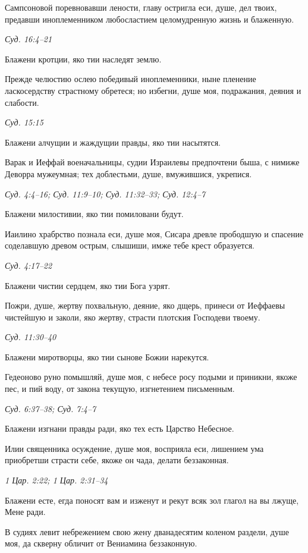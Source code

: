 Сампсоновой поревновавши лености, главу остригла еси, душе, дел твоих, предавши иноплеменником любосластием целомудренную жизнь и блаженную.


\itshape Суд. 16:4–21\normalfont{}


Блажени кротции, яко тии наследят землю.


Прежде челюстию ослею победивый иноплеменники, ныне пленение ласкосердству страстному обретеся; но избегни, душе моя, подражания, деяния и слабости.


\itshape Суд. 15:15\normalfont{}


Блажени алчущии и жаждущии правды, яко тии насытятся.


Варак и Иеффай военачальницы, судии Израилевы предпочтени быша, с нимиже Деворра мужеумная; тех доблестьми, душе, вмужившися, укрепися.


\itshape Суд. 4:4–16; Суд. 11:9–10; Суд. 11:32–33; Суд. 12:4–7\normalfont{}


Блажени милостивии, яко тии помиловани будут.


Иаилино храбрство познала еси, душе моя, Сисара древле прободшую и спасение соделавшую древом острым, слышиши, имже тебе крест образуется.


\itshape Суд. 4:17–22\normalfont{}


Блажени чистии сердцем, яко тии Бога узрят.


Пожри, душе, жертву похвальную, деяние, яко дщерь, принеси от Иеффаевы чистейшую и заколи, яко жертву, страсти плотския Господеви твоему.


\itshape Суд. 11:30–40\normalfont{}


Блажени миротворцы, яко тии сынове Божии нарекутся.


Гедеоново руно помышляй, душе моя, с небесе росу подыми и приникни, якоже пес, и пий воду, от закона текущую, изгнетением письменным.


\itshape Суд. 6:37–38; Суд. 7:4–7\normalfont{}


Блажени изгнани правды ради, яко тех есть Царство Небесное.


Илии священника осуждение, душе моя, восприяла еси, лишением ума приобретши страсти себе, якоже он чада, делати беззаконная.


\itshape 1 Цар. 2:22; 1 Цар. 2:31–34\normalfont{}


Блажени есте, егда поносят вам и изженут и рекут всяк зол глагол на вы лжуще, Мене ради.


В судиях левит небрежением свою жену дванадесятим коленом раздели, душе моя, да скверну обличит от Вениамина беззаконную.


